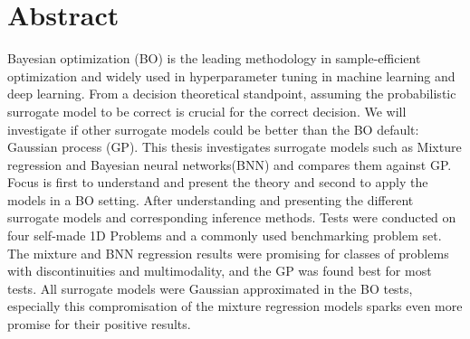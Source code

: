 \section*{Abstract}
Bayesian optimization (BO) is the leading methodology in sample-efficient optimization and
widely used in hyperparameter tuning in machine learning and deep learning. 
From a decision theoretical standpoint, assuming the probabilistic surrogate model to be correct
is crucial for the correct decision. We will investigate if other surrogate models could be better
than the BO default: Gaussian process (GP). 
This thesis investigates surrogate models such as Mixture regression and Bayesian neural
networks(BNN) and compares them against GP. Focus is first to understand and present the theory and second to apply the
models in a BO setting. %
After understanding and presenting the different surrogate models and corresponding inference
methods. Tests were conducted on four self-made 1D Problems and a commonly used benchmarking problem
set. The mixture and BNN regression results were promising for classes of problems with
discontinuities and multimodality, and the GP was found best for most tests. All surrogate models
were Gaussian approximated in the BO tests, especially this compromisation of the mixture regression models
sparks even more promise for their positive results.


